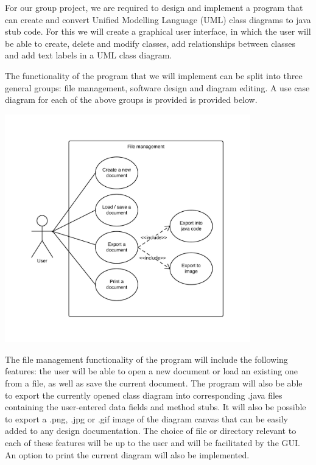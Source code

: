 
\tab For our group project, we are required to design and implement a program that can create and convert Unified Modelling Language (UML) class diagrams to java stub code. For this we will create a graphical user interface, in which the user will be able to create, delete and modify classes, add relationships between classes and add text labels in a UML class diagram. 

The functionality of the program that we will implement can be split into three general groups: file management, software design and diagram editing. A use case diagram for each of the above groups is provided is provided below. 

\vspace{-10pt}
\begin{center}
	\includegraphics[trim=0 20pt 0 20pt,clip, width=0.8\textwidth]{FileManagementUseCaseDiagram.jpeg}
\end{center}
\vspace{-10pt}

The file management functionality of the program will include the following features: the user will be able to open a new document or load an existing one from a file, as well as save the current document. The program will also be able to export the currently opened class diagram into corresponding .java files containing the user-entered data fields and method stubs. It will also be possible to export a .png, .jpg or .gif image of the diagram canvas that can be easily added to any design documentation. The choice of file or directory relevant to each of these features will be up to the user and will be facilitated by the GUI. An option to print the current diagram will also be implemented.
 
